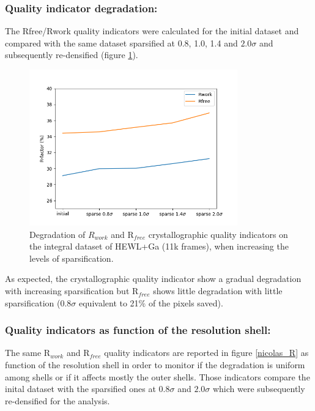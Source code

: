 \documentclass[preprint]{iucr}              %
\begin{document}
\subsubsection{Quality indicator degradation:}
The Rfree/Rwork quality indicators \cite{Rfree} were calculated for the initial dataset and compared with the same dataset sparsified at 0.8, 1.0, 1.4 and $2.0\sigma$ and subsequently re-densified (figure \ref{Rfree}). 

\begin{figure}
\label{Rfree}
\begin{center}
\includegraphics[width=9cm]{fig_Rfree}
\caption{Degradation of $R_{work}$ and R$_{free}$ crystallographic quality indicators on the integral dataset of HEWL+Ga (11k frames), when increasing the levels of sparsification.}
\end{center}
\end{figure}
As expected, the crystallographic quality indicator show a gradual degradation with increasing sparsification but R$_{free}$ shows little degradation with little sparsification ($0.8\sigma$ equivalent to 21\% of the pixels saved).

\subsubsection{Quality indicators as function of the resolution shell:}
The same R$_{work}$ and R$_{free}$ quality indicators are reported in figure \ref{nicolas_R} as function of the resolution shell in order to monitor if the degradation is uniform among shells or if it affects mostly the outer shells.
Those indicators compare the inital dataset with the sparsified ones at $0.8\sigma$ and $2.0\sigma$ which were subsequently re-densified for the analysis.
\end{document}
